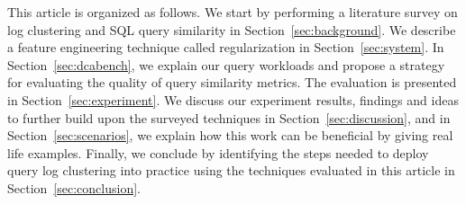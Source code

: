 This article is organized as follows.
We start by performing a literature survey on log clustering and SQL query similarity in Section~\ref{sec:background}.
We describe a feature engineering technique called regularization in Section~\ref{sec:system}.
In Section~\ref{sec:dcabench}, we explain our query workloads and propose a strategy for evaluating the quality of query similarity metrics.
The evaluation is presented in Section~\ref{sec:experiment}.
We discuss our experiment results, findings and ideas to further build upon the surveyed techniques in Section~\ref{sec:discussion}, and in Section~\ref{sec:scenarios}, we explain how this work can be beneficial by giving real life examples.
Finally, we conclude by identifying the steps needed to deploy query log clustering into practice using the techniques evaluated in this article in Section~\ref{sec:conclusion}.


